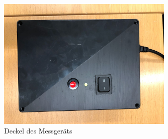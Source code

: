 \documentclass[a4paper]{article}
\begin{document}
\begin{figure}[h]
	\centering
	\includegraphics[width=0.75\textwidth, angle=-90]{manual_deckel.jpeg}
	\caption{Deckel des Messgeräts}
	\label{deckel}
\end{figure}
\end{document}
